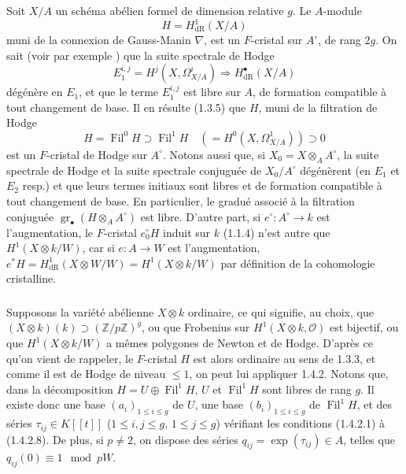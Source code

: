 \documentclass[12pt,a4paper]{article}
\theoremstyle{plain}
\theoremstyle{definition}
\theoremstyle{remark}
\DeclareMathOperator{\Fil}{Fil}
\DeclareMathOperator{\gr}{gr}
\begin{document}
\subsubsection{}
Soit $X/A$ un sch\'ema ab\'elien formel de dimension relative $g$. Le $A$-module
\[
H = H^1_\mathrm{dR}(X/A)
\]
muni de la connexion de Gauss-Manin $\nabla$, est un $F$-cristal sur $A^\circ$, de rang $2g$. On sait (voir par exemple \cite[Addendum]{MazurMessing}) que la suite spectrale de Hodge
\[
E^{i,j}_1 = H^j(X, \Omega^i_{X/A}) \Longrightarrow H^\bullet_\mathrm{dR}(X/A)
\]
d\'eg\'en\`ere en $E_1$, et que le terme $E^{i,j}_1$ est libre sur $A$, de formation compatible \`a tout changement de base. Il en r\'esulte (1.3.5) que $H$, muni de la filtration de Hodge
\[
H = \Fil^0 H \supset \Fil^1 H \quad (= H^0(X, \Omega^1_{X/A})) \supset 0
\]
est un $F$-cristal de Hodge sur $A^\circ$. Notons aussi que, si $X_0 = X \otimes_A A^\circ$, la suite spectrale de Hodge et la suite spectrale conjugu\'ee de $X_0/A^\circ$ d\'eg\'en\`erent (en $E_1$ et $E_2$ resp.) et que leurs termes initiaux sont libres et de formation compatible \`a tout changement de base. En particulier, le gradu\'e associ\'e \`a la filtration conjugu\'ee $\gr_\bullet(H \otimes_A A^\circ)$ est libre. D'autre part, si $e^\circ : A^\circ \to k$ est l'augmentation, le $F$-cristal $e^\circ_0 H$ induit sur $k$ (1.1.4) n'est autre que $H^1(X \otimes k/W)$, car si $e : A \to W$ est l'augmentation, $e^*H = H^1_\mathrm{dR}(X \otimes W/W) = H^1(X \otimes k/W)$ par d\'efinition de la cohomologie cristalline.

\subsubsection{}
Supposons la vari\'et\'e ab\'elienne $X \otimes k$ ordinaire, ce qui signifie, au choix, que $(X \otimes k)(k) \supset (\mathbb{Z}/p\mathbb{Z})^g$, ou que Frobenius sur $H^1(X \otimes k, \mathcal{O})$ est bijectif, ou que $H^1(X \otimes k/W)$ a m\^emes polygones de Newton et de Hodge. D'apr\`es ce qu'on vient de rappeler, le $F$-cristal $H$ est alors ordinaire au sens de 1.3.3, et comme il est de Hodge de niveau $\leqslant 1$, on peut lui appliquer 1.4.2. Notons que, dans la d\'ecomposition $H = U \oplus \Fil^1 H$, $U$ et $\Fil^1 H$ sont libres de rang $g$. Il existe donc une base $(a_i)_{1\leqslant i\leqslant g}$ de $U$, une base $(b_i)_{1\leqslant i\leqslant g}$ de $\Fil^1 H$, et des s\'eries $\tau_{ij} \in K[[t]]$ ($1\leqslant i,j\leqslant g$, $1\leqslant j\leqslant g$) v\'erifiant les conditions (1.4.2.1) \`a (1.4.2.8). De plus, si $p \neq 2$, on dispose des s\'eries $q_{ij} = \exp(\tau_{ij}) \in A$, telles que $q_{ij}(0) \equiv 1 \mod pW$.
\end{document}

